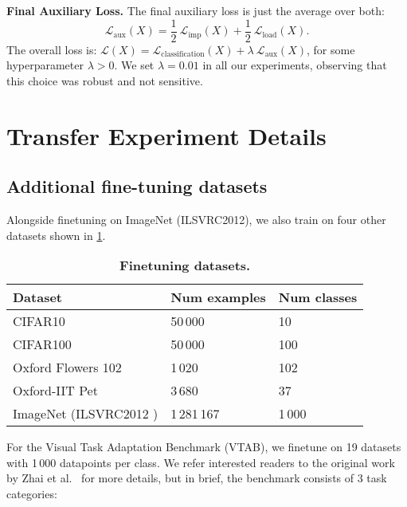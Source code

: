 \documentclass{article}
\begin{document}
\textbf{Final Auxiliary Loss.}
The final auxiliary loss is just the average over both:
\begin{equation}
    \mathcal{L}_{\text{aux}}(X) =  \frac{1}{2} \ \mathcal{L}_{\text{imp}}(X) + \frac{1}{2} \ \mathcal{L}_{\text{load}}(X).
\end{equation}
The overall loss is: $\mathcal{L}(X) = \mathcal{L}_{\text{classification}}(X) + \lambda \ \mathcal{L}_{\text{aux}}(X)$, for some hyperparameter $\lambda > 0$.
We set $\lambda = 0.01$ in all our experiments, observing that this choice was robust and not sensitive.
 \clearpage
\section{Transfer Experiment Details}
\label{sec:experiment_details}

\subsection{Additional fine-tuning datasets}\label{sec:additional_datasets}
Alongside finetuning on ImageNet (ILSVRC2012\cite{deng2009imagenet}), we also train on four other datasets shown in \cref{tab:finetuning_datasets}.
\begin{table}[]
\caption{\textbf{Finetuning datasets.}
\label{tab:finetuning_datasets}}
\begin{tabular}{@{}lll@{}}
\toprule
Dataset                                        & Num examples & Num classes \\ \midrule
CIFAR10 \cite{krizhevsky2009learning}           & 50\,000       & 10          \\
CIFAR100 \cite{krizhevsky2009learning}          & 50\,000       & 100         \\
Oxford Flowers 102 \cite{nilsback2008automated} & 1\,020        & 102         \\
Oxford-IIT Pet \cite{parkhi2012cats}            & 3\,680        & 37          \\
ImageNet (ILSVRC2012 \cite{deng2009imagenet})   & 1\,281\,167   & 1\,000      \\
\bottomrule
\end{tabular}
\end{table}
For the Visual Task Adaptation Benchmark (VTAB\cite{zhai2019large}), we finetune on 19 datasets with 1\,000 datapoints per class. We refer interested readers to the original work by Zhai et al.~\cite{zhai2019large} for more details, but in brief, the benchmark consists of 3 task categories:
\end{document}
